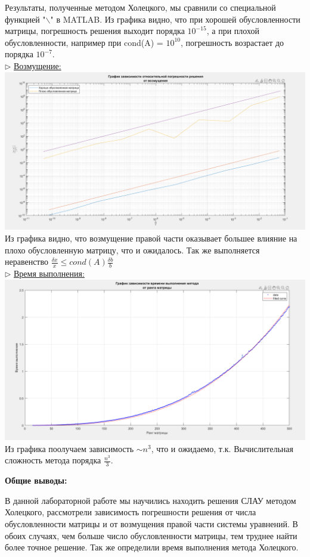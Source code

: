 \documentclass{article}
\begin{document}
	Результаты, полученные методом Холецкого, мы сравнили со специальной функцией "$\backslash$" в MATLAB. Из графика видно, что при хорошей обусловленности матрицы, погрешность решения выходит порядка $10^{-15}$, а при плохой обусловленности, например при cond(A) = $10^10$, погрешность возрастает до порядка $10^{-7}$.\\
	$\triangleright$ \underline{Возмущение:}\\
	\includegraphics[scale = 0.394]{Возмущение}\\
	Из графика видно, что возмущение правой части оказывает большее влияние на плохо обусловленную матрицу, что и ожидалось. Так же выполняется неравенство $\frac{\delta x}{x} \leq cond(A)\frac{\delta b}{b}$\\
	\newpage
	$\triangleright$ \underline{Время выполнения:}\\
	\includegraphics[scale = 0.4]{Время выполнения}\\
	Из графика поолучаем зависимость $\sim n^3$, что и ожидаемо, т.к. Вычислительная сложность метода порядка $\frac{n^3}{3}$.
	\begin{center} \textbf{Общие выводы:}\end{center}
	В данной лабораторной работе мы научились находить решения СЛАУ методом Холецкого, рассмотрели зависимость погрешности решения от числа обусловленности матрицы и от возмущения правой части системы уравнений. В обоих случаях, чем больше число обусловленности матрицы, тем труднее найти более точное решение. Так же определили время выполнения метода Холецкого.
\end{document}
